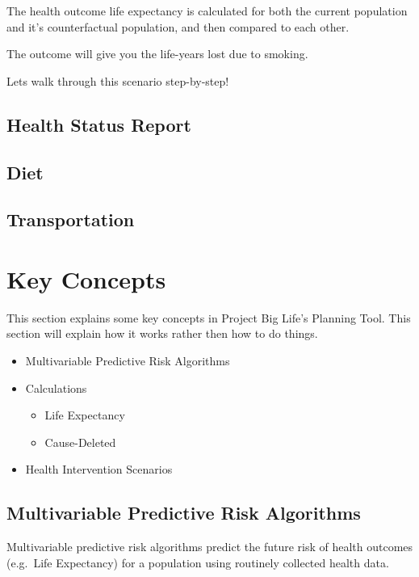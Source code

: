 \documentclass[]{book}
\providecommand{\tightlist}{%
  \setlength{\itemsep}{0pt}\setlength{\parskip}{0pt}}
\begin{document}
The health outcome life expectancy is calculated for both the current
population and it's counterfactual population, and then compared to each
other.

The outcome will give you the life-years lost due to smoking.

Lets walk through this scenario step-by-step!

\section{Health Status Report}\label{health-status-report}

\section{Diet}\label{diet}

\section{Transportation}\label{transportation}

\chapter{Key Concepts}\label{keyconcepts}

This section explains some key concepts in Project Big Life's Planning
Tool. This section will explain how it works rather then how to do
things.

\begin{itemize}
\item
  Multivariable Predictive Risk Algorithms
\item
  Calculations

  \begin{itemize}
  \tightlist
  \item
    Life Expectancy
  \item
    Cause-Deleted
  \end{itemize}
\item
  Health Intervention Scenarios
\end{itemize}

\section{Multivariable Predictive Risk
Algorithms}\label{multivariable-predictive-risk-algorithms}

Multivariable predictive risk algorithms predict the future risk of
health outcomes (e.g.~Life Expectancy) for a population using routinely
collected health data.
\end{document}
